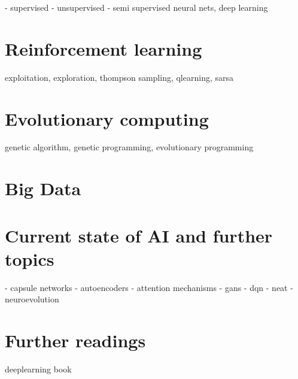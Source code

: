 \documentclass[jou,apacite]{apa6}
\begin{document}
 - supervised
  - unsupervised
  - semi supervised
  neural nets, deep learning

\section{Reinforcement learning}
exploitation, exploration, thompson sampling, qlearning, sarsa

\section{Evolutionary computing}
genetic algorithm, genetic programming, evolutionary programming

\section{Big Data}

\section{Current state of AI and further topics}
 - capsule networks
 - autoencoders
 - attention mechanisms
 - gans
 - dqn
 - neat
 - neuroevolution

\section{Further readings}
deeplearning book

\printglossaries
\printindex

\end{document}

